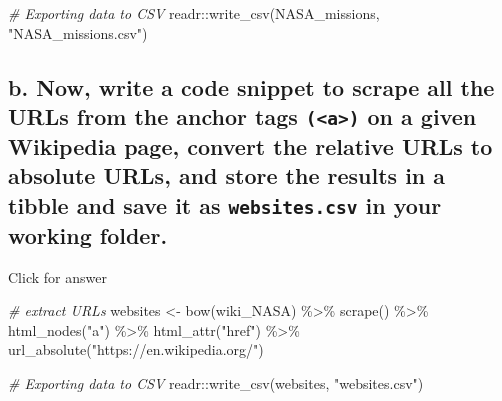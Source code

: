 \documentclass[
]{book}
\newenvironment{Shaded}{\begin{snugshade}}{\end{snugshade}}
\newcommand{\CommentTok}[1]{\textcolor[rgb]{0.56,0.35,0.01}{\textit{#1}}}
\newcommand{\FunctionTok}[1]{\textcolor[rgb]{0.00,0.00,0.00}{#1}}
\newcommand{\NormalTok}[1]{#1}
\newcommand{\OtherTok}[1]{\textcolor[rgb]{0.56,0.35,0.01}{#1}}
\newcommand{\SpecialCharTok}[1]{\textcolor[rgb]{0.00,0.00,0.00}{#1}}
\newcommand{\StringTok}[1]{\textcolor[rgb]{0.31,0.60,0.02}{#1}}
\begin{document}
\begin{Shaded}
\begin{Highlighting}[]
\CommentTok{\# Exporting data to CSV}
\NormalTok{readr}\SpecialCharTok{::}\FunctionTok{write\_csv}\NormalTok{(NASA\_missions, }\StringTok{"NASA\_missions.csv"}\NormalTok{)}
\end{Highlighting}
\end{Shaded}

\hypertarget{b.-now-write-a-code-snippet-to-scrape-all-the-urls-from-the-anchor-tags-a-on-a-given-wikipedia-page-convert-the-relative-urls-to-absolute-urls-and-store-the-results-in-a-tibble-and-save-it-as-websites.csv-in-your-working-folder.}{%
\subsection{\texorpdfstring{b. Now, write a code snippet to scrape all the URLs from the anchor tags \texttt{(\textless{}a\textgreater{})} on a given Wikipedia page, convert the relative URLs to absolute URLs, and store the results in a tibble and save it as \texttt{websites.csv} in your working folder.}{b. Now, write a code snippet to scrape all the URLs from the anchor tags (\textless a\textgreater) on a given Wikipedia page, convert the relative URLs to absolute URLs, and store the results in a tibble and save it as websites.csv in your working folder.}}\label{b.-now-write-a-code-snippet-to-scrape-all-the-urls-from-the-anchor-tags-a-on-a-given-wikipedia-page-convert-the-relative-urls-to-absolute-urls-and-store-the-results-in-a-tibble-and-save-it-as-websites.csv-in-your-working-folder.}}

Click for answer

\begin{Shaded}
\begin{Highlighting}[]
\CommentTok{\# extract URLs}
\NormalTok{websites }\OtherTok{\textless{}{-}}  \FunctionTok{bow}\NormalTok{(wiki\_NASA) }\SpecialCharTok{\%\textgreater{}\%} \FunctionTok{scrape}\NormalTok{() }\SpecialCharTok{\%\textgreater{}\%} 
  \FunctionTok{html\_nodes}\NormalTok{(}\StringTok{"a"}\NormalTok{) }\SpecialCharTok{\%\textgreater{}\%}
  \FunctionTok{html\_attr}\NormalTok{(}\StringTok{"href"}\NormalTok{) }\SpecialCharTok{\%\textgreater{}\%} 
  \FunctionTok{url\_absolute}\NormalTok{(}\StringTok{"https://en.wikipedia.org/"}\NormalTok{) }
\end{Highlighting}
\end{Shaded}

\begin{Shaded}
\begin{Highlighting}[]
\CommentTok{\# Exporting data to CSV}
\NormalTok{readr}\SpecialCharTok{::}\FunctionTok{write\_csv}\NormalTok{(websites, }\StringTok{"websites.csv"}\NormalTok{)}
\end{Highlighting}
\end{Shaded}
\end{document}
